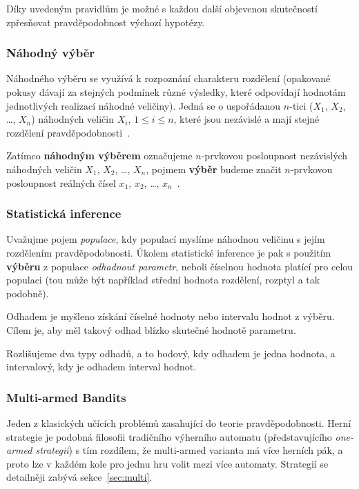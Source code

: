\documentclass[thesis=M,czech]{FITthesis}[2014/05/07]
\begin{document}
Díky uvedeným pravidlům je možné s každou další objevenou skutečností zpřesňovat pravděpodobnost výchozí hypotézy. 

\subsubsection{Náhodný výběr}
\label{randomvyber}
Náhodného výběru se využívá k rozpoznání charakteru rozdělení (opakované pokusy dávají za stejných podmínek různé výsledky, které odpovídají hodnotám jednotlivých realizací náhodné veličiny). Jedná se o uspořádanou $n$-tici ($X_1$, $X_2$, \ldots, $X_n$) náhodných veličin $X_i$, $1 \leq i \leq n$, které jsou nezávislé a mají stejné rozdělení pravděpodobnosti~\cite{pst3}.

Zatímco \textbf{náhodným výběrem} označujeme $n$-prvkovou posloupnost nezávislých náhodných veličin $X_1$, $X_2$, \ldots, $X_n$, pojmem \textbf{výběr} budeme značit $n$-prvkovou posloupnost reálných čísel $x_1$, $x_2$, \ldots, $x_n$~\cite{pst5}. 

\subsubsection{Statistická inference}
\label{inferno}
\cite{pst5} Uvažujme pojem \emph{populace}, kdy populací myslíme náhodnou veličinu s jejím rozdělením pravděpodobnosti. Úkolem statistické inference je pak s použitím \textbf{výběru} z populace \emph{odhadnout parametr}, neboli číselnou hodnota platící pro celou populaci (tou může být například střední hodnota rozdělení, rozptyl a tak podobně).

Odhadem je myšleno získání číselné hodnoty nebo intervalu hodnot z výběru. Cílem je, aby měl takový odhad blízko skutečné hodnotě parametru.

Rozlišujeme dva typy odhadů, a to bodový, kdy odhadem je jedna hodnota, a intervalový, kdy je odhadem interval hodnot. 

\subsubsection{Multi-armed Bandits}
\label{sub:mabandit}
Jeden z klasických učících problémů zasahující do teorie pravděpodobnosti. Herní strategie je podobná filosofii tradičního výherního automatu (představujícího \emph{one-armed strategii}) s tím rozdílem, že multi-armed varianta má více herních pák, a proto lze v každém kole pro jednu hru volit mezi více automaty. Strategií se detailněji zabývá sekce~\ref{sec:multi}.
\end{document}
